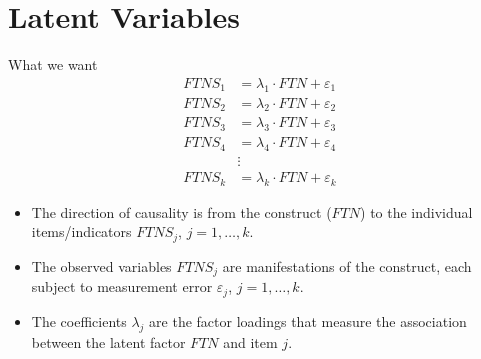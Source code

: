 \documentclass{beamer}
\begin{document}
\section{Latent Variables}
\begin{frame}{What we want}
\[
\begin{aligned}
FTNS_1 &= \lambda_1 \cdot FTN + \varepsilon_1 \\
FTNS_2 &= \lambda_2 \cdot FTN + \varepsilon_2 \\
FTNS_3 &= \lambda_3 \cdot FTN + \varepsilon_3 \\
FTNS_4 &= \lambda_4 \cdot FTN + \varepsilon_4 \\
&\vdots \\
FTNS_k &= \lambda_k \cdot FTN + \varepsilon_k
\end{aligned}
\]
\begin{itemize}
  \item The direction of causality is from the construct ($FTN$) to the individual items/indicators $FTNS_j$, $j=1,\dots,k$.
  \item The observed variables $FTNS_j$ are manifestations of the construct, each subject to measurement error $\varepsilon_j$, $j=1,\dots,k$.
  \item The coefficients $\lambda_j$ are the factor loadings that measure the association between the latent factor $FTN$ and item $j$.
\end{itemize}
\end{frame}

\end{document}
